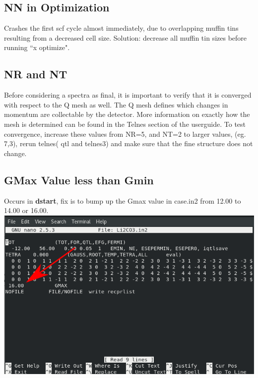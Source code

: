 \documentclass[12pt]{article}
\begin{document}
\subsection{NN in Optimization}
Crashes the first scf cycle almost immediately, due to overlapping muffin tins resulting from a decreased cell size.  Solution: decrease all muffin tin sizes before running ``x optimize".

\subsection{NR and NT}
Before considering a spectra as final, it is important to verify that it is converged with respect to the Q mesh as well.  The Q mesh defines which changes in momentum are collectable by the detector.  More information on exactly how the mesh is determined can be found in the Telnes section of the userguide.  To test convergence, increase these values from NR=5, and NT=2 to larger values, (eg. 7,3), rerun telnes( qtl and telnes3) and make sure that the fine structure does not change.  


\subsection{GMax Value less than Gmin}

Occurs in \textbf{dstart}, fix is to bump up the Gmax value in case.in2 from 12.00 to 14.00 or 16.00.
\includegraphics[scale=0.5]{./images/gmax_err.png}
\end{document}
